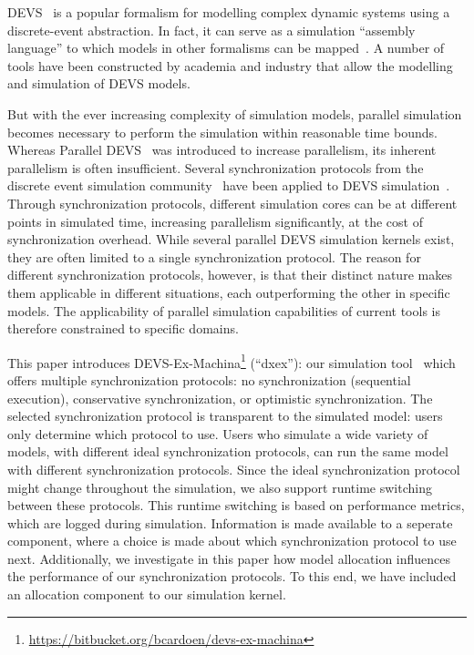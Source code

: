\textsf{DEVS}~\cite{ClassicDEVS} is a popular formalism for modelling complex dynamic systems using a discrete-event abstraction.
In fact, it can serve as a simulation ``assembly language'' to which models in other formalisms can be mapped~\cite{DEVSbase}.
A number of tools have been constructed by academia and industry that allow the modelling and simulation of \textsf{DEVS} models.

But with the ever increasing complexity of simulation models, parallel simulation becomes necessary to perform the simulation within reasonable time bounds.
Whereas \textsf{Parallel DEVS}~\cite{ParallelDEVS} was introduced to increase parallelism, its inherent parallelism is often insufficient.
Several synchronization protocols from the discrete event simulation community~\cite{FujimotoBook} have been applied to \textsf{DEVS} simulation~\cite{globaltimewarp}.
Through synchronization protocols, different simulation cores can be at different points in simulated time, increasing parallelism significantly, at the cost of synchronization overhead.
While several parallel \textsf{DEVS} simulation kernels exist, they are often limited to a single synchronization protocol.
The reason for different synchronization protocols, however, is that their distinct nature makes them applicable in different situations, each outperforming the other in specific models.
The applicability of parallel simulation capabilities of current tools is therefore constrained to specific domains.

This paper introduces DEVS-Ex-Machina\footnote{\url{https://bitbucket.org/bcardoen/devs-ex-machina}} (``dxex''): our simulation tool~\cite{dxex} which offers multiple synchronization protocols: no synchronization (sequential execution), conservative synchronization, or optimistic synchronization.
The selected synchronization protocol is transparent to the simulated model: users only determine which protocol to use.
Users who simulate a wide variety of models, with different ideal synchronization protocols, can run the same model with different synchronization protocols.
Since the ideal synchronization protocol might change throughout the simulation, we also support runtime switching between these protocols.
This runtime switching is based on performance metrics, which are logged during simulation.
Information is made available to a seperate component, where a choice is made about which synchronization protocol to use next.
Additionally, we investigate in this paper how model allocation influences the performance of our synchronization protocols.
To this end, we have included an allocation component to our simulation kernel.

